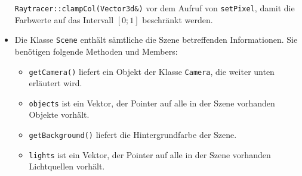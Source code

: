 \begin{itemize}
        \texttt{Raytracer::clampCol(Vector3d\&)} vor dem Aufruf von
        \texttt{setPixel}, damit die Farbwerte auf das Intervall 
        $[0; 1]$ beschränkt werden.
  \item Die Klasse \texttt{Scene} enthält sämtliche die Szene
        betreffenden Informationen. Sie benötigen folgende Methoden und
        Members:
        \begin{itemize}
          \item \texttt{getCamera()} liefert ein Objekt der Klasse
                \texttt{Camera}, die weiter unten erläutert wird.
          \item \texttt{objects} ist ein Vektor, der Pointer auf alle in
                der Szene vorhanden Objekte vorhält.
          \item \texttt{getBackground()} liefert die Hintergrundfarbe 
                der Szene. 
          \item \texttt{lights} ist ein Vektor, der Pointer auf alle in 
                der Szene vorhanden Lichtquellen vorhält.
        \end{itemize}


\end{itemize}
